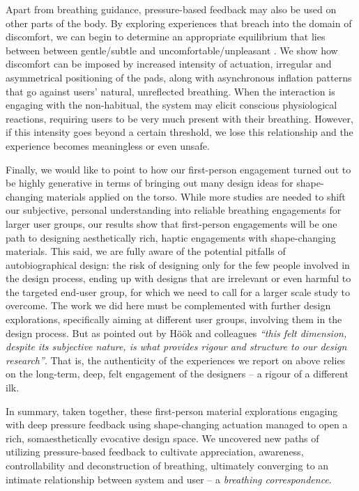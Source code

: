 Apart from breathing guidance, pressure-based feedback may also be used on other parts of the body. By exploring experiences that breach into the domain of discomfort, we can begin to determine an appropriate equilibrium that lies between between gentle/subtle and uncomfortable/unpleasant \cite{benford_uncomfortable_2012}. We show how discomfort can be imposed by increased intensity of actuation, irregular and asymmetrical positioning of the pads, along with asynchronous inflation patterns that go against users' natural, unreflected breathing. When the interaction is engaging with the non-habitual, the system may elicit conscious physiological reactions, requiring users to be very much present with their breathing. However, if this intensity goes beyond a certain threshold, we lose this relationship and the experience becomes meaningless or even unsafe.


Finally, we would like to point to how our first-person engagement turned out to be highly generative in terms of bringing out many design ideas for shape-changing materials applied on the torso. While more studies are needed to shift our subjective, personal understanding into reliable breathing engagements for larger user groups, our results show that first-person engagements will be one path to designing aesthetically rich, haptic engagements with shape-changing materials. This said, we are fully aware of the potential pitfalls of autobiographical design: the risk of designing only for the few people involved in the design process, ending up with designs that are irrelevant or even harmful to the targeted end-user group, for which we need to call for a larger scale study to overcome. The work we did here must be complemented with further design explorations, specifically aiming at different user groups, involving them in the design process. But as pointed out by Höök and colleagues \cite{hook_embracing_2018} \textit{``this felt
dimension, despite its subjective nature, is what provides rigour and structure to our design research''}. That is, the authenticity of the experiences we report on above relies on the long-term, deep, felt engagement of the designers -- a rigour of a different ilk.

In summary, taken together, these first-person material explorations engaging with deep pressure feedback using shape-changing actuation managed to open a rich, somaesthetically evocative design space. We uncovered new paths of utilizing pressure-based feedback to cultivate appreciation, awareness, controllability and deconstruction of breathing, ultimately converging to an intimate relationship between system and user -- a \textit{breathing correspondence}.
